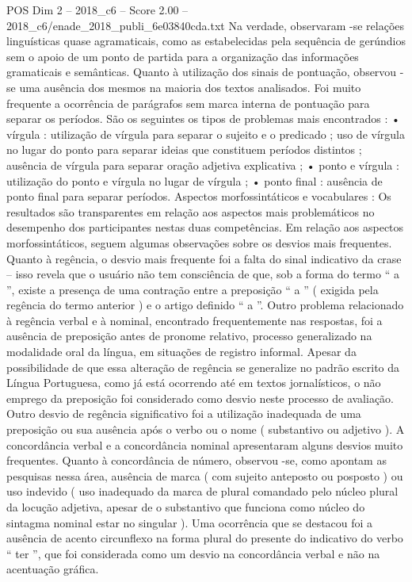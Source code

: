 \begin{textsample}{POS Dim 2 – 2018\_c6 – Score 2.00 – 2018\_c6/enade\_2018\_publi\_6e03840cda.txt}
Na verdade, observaram -se relações linguísticas quase agramaticais, como as estabelecidas pela sequência de gerúndios sem o apoio de um ponto de partida para a organização das informações gramaticais e semânticas.
Quanto à utilização dos sinais de pontuação, observou -se uma ausência dos mesmos na maioria dos textos analisados.
Foi muito frequente a ocorrência de parágrafos sem marca interna de pontuação para separar os períodos.
São os seguintes os tipos de problemas mais encontrados : • vírgula : utilização de vírgula para separar o sujeito e o predicado ; uso de vírgula no lugar do ponto para separar ideias que constituem períodos distintos ; ausência de vírgula para separar oração adjetiva explicativa ; • ponto e vírgula : utilização do ponto e vírgula no lugar de vírgula ; • ponto final : ausência de ponto final para separar períodos.
Aspectos morfossintáticos e vocabulares : Os resultados são transparentes em relação aos aspectos mais problemáticos no desempenho dos participantes nestas duas competências.
Em relação aos aspectos morfossintáticos, seguem algumas observações sobre os desvios mais frequentes.
Quanto à regência, o desvio mais frequente foi a falta do sinal indicativo da crase – isso revela que o usuário não tem consciência de que, sob a forma do termo “ a ”, existe a presença de uma contração entre a preposição “ a ” ( exigida pela regência do termo anterior ) e o artigo definido “ a ”.
Outro problema relacionado à regência verbal e à nominal, encontrado frequentemente nas respostas, foi a ausência de preposição antes de pronome relativo, processo generalizado na modalidade oral da língua, em situações de registro informal.
Apesar da possibilidade de que essa alteração de regência se generalize no padrão escrito da Língua Portuguesa, como já está ocorrendo até em textos jornalísticos, o não emprego da preposição foi considerado como desvio neste processo de avaliação.
Outro desvio de regência significativo foi a utilização inadequada de uma preposição ou sua ausência após o verbo ou o nome ( substantivo ou adjetivo ).
A concordância verbal e a concordância nominal apresentaram alguns desvios muito frequentes.
Quanto à concordância de número, observou -se, como apontam as pesquisas nessa área, ausência de marca ( com sujeito anteposto ou posposto ) ou uso indevido ( uso inadequado da marca de plural comandado pelo núcleo plural da locução adjetiva, apesar de o substantivo que funciona como núcleo do sintagma nominal estar no singular ).
Uma ocorrência que se destacou foi a ausência de acento circunflexo na forma plural do presente do indicativo do verbo “ ter ”, que foi considerada como um desvio na concordância verbal e não na acentuação gráfica.

\end{textsample}
